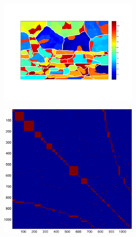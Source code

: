 \documentclass{article} %
\begin{document}
\begin{figure}
\begin{subfigure}[c]{\textwidth}
\begin{subfigure}[c]{0.195\textwidth}
			\label{fig:4_1_s_map}
		\end{subfigure}
		\begin{subfigure}[]{0.195\textwidth}
			\includegraphics[width = \textwidth]{./img/su4_1_s.pdf}
			\label{fig:4_1_s_su}
		\end{subfigure}
		\begin{subfigure}[c]{0.195\textwidth}
			\includegraphics[width = \textwidth]{./img/adj4_1_s.pdf}
			\label{fig4_1_s_adj}
		\end{subfigure}
	\end{subfigure}
	

\end{figure}
\end{document}
